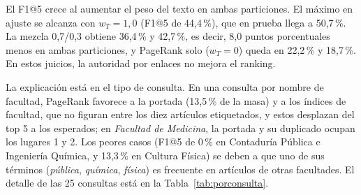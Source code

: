 \documentclass[11pt,letterpaper]{article}
\begin{document}
	El F1@5 crece al aumentar el peso del texto en ambas particiones. El máximo en ajuste se alcanza con \(w_T=1{,}0\) (F1@5 de 44,4\,\%), que en prueba llega a 50,7\,\%. La mezcla 0,7/0,3 obtiene 36,4\,\% y 42,7\,\%, es decir, 8,0 puntos porcentuales menos en ambas particiones, y PageRank solo (\(w_T=0\)) queda en 22,2\,\% y 18,7\,\%. En estos juicios, la autoridad por enlaces no mejora el ranking.
	
	La explicación está en el tipo de consulta. En una consulta por nombre de facultad, PageRank favorece a la portada (13,5\,\% de la masa) y a los índices de facultad, que no figuran entre los diez artículos etiquetados, y estos desplazan del top 5 a los esperados; en \emph{Facultad de Medicina}, la portada y su duplicado ocupan los lugares 1 y 2. Los peores casos (F1@5 de 0\,\% en Contaduría Pública e Ingeniería Química, y 13,3\,\% en Cultura Física) se deben a que uno de sus términos (\emph{pública}, \emph{química}, \emph{física}) es frecuente en artículos de otras facultades. El detalle de las 25 consultas está en la Tabla~\ref{tab:porconsulta}.
	
\end{document}
